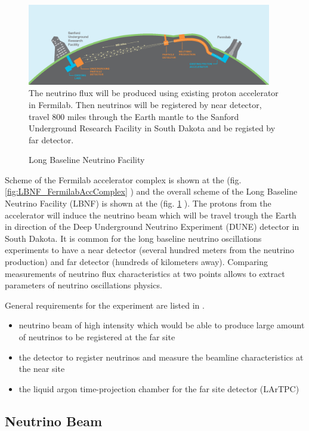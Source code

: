 \begin{figure}
\caption{Long Baseline Neutrino Facility}
\label{fig:LBNF_overallScheme}
\centering
\includegraphics[width=0.95\textwidth, keepaspectratio=true]{figs/LBNF_overallScheme.png}
\\The neutrino flux will be produced using existing proton accelerator in Fermilab. Then neutrinos will be registered by near detector, travel 800 miles through the Earth mantle to the Sanford Underground Research Facility in South Dakota and be registed by far detector. \cite{ref_LBNFweb}   
\end{figure}

Scheme of the Fermilab accelerator complex is shown at the (fig. \ref{fig:LBNF_FermilabAccComplex} ) and the overall scheme of the 
Long Baseline Neutrino Facility (LBNF) is shown at the (fig. \ref{fig:LBNF_overallScheme} ). The protons from the accelerator  will induce the neutrino beam which will be travel trough the Earth in direction of the Deep Underground Neutrino Experiment (DUNE) detector in South Dakota. It is common for the long baseline neutrino oscillations experiments to have a near detector (several hundred meters from the neutrino production) and far detector (hundreds of kilometers away). Comparing measurements of neutrino flux characteristics at two points allows to extract parameters of neutrino oscillations physics.

General requirements for the experiment are listed in \cite{ref_LBNFdoc_volume-detectors}.
\begin{itemize}
  \item neutrino beam of high intensity which would be able to produce large amount of neutrinos to be registered at the far site
  \item the detector to register neutrinos and measure the beamline characteristics at the near site
  \item the liquid argon time-projection chamber for the far site detector (LArTPC)
\end{itemize}

\subsection{Neutrino Beam}

